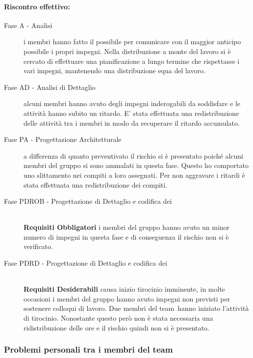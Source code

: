 \documentclass[../PianoProgetto.tex]{subfiles}
\begin{document}
	\paragraph*{Riscontro effettivo:}
		\begin{description}
			\item[Fase A - Analisi] i membri hanno fatto il possibile per comunicare con il maggior anticipo possibile i propri impegni. Nella distribuzione a monte del lavoro si è cercato di effettuare una pianificazione a lungo termine che rispettasse i vari impegni, mantenendo una distribuzione equa del lavoro.
			\item[Fase AD - Analisi di Dettaglio] alcuni membri hanno avuto degli impegni inderogabili da soddisfare e le attività hanno subito un ritardo. E' stata effettuata una redistribuzione delle attività tra i membri in modo da recuperare il ritardo accumulato. 
			\item[Fase PA - Progettazione Architetturale] a differenza  di quanto preventivato il rischio si è presentato poiché alcuni membri del gruppo si sono ammalati in questa fase. Questo ho comportato uno slittamento nei compiti a loro assegnati. Per non aggravare i ritardi è stata effettuata una redistribuzione dei compiti.
			\item[Fase PDROB - Progettazione di Dettaglio e codifica dei]  \ \\
					\textbf{Requisiti Obbligatori} i membri del gruppo hanno avuto un minor numero di impegni in questa fase e di conseguenza il rischio non si è verificato.
			\item[Fase PDRD - Progettazione di Dettaglio e codifica dei] \ \\
					\textbf{Requisiti Desiderabili} causa inizio tirocinio imminente, in molte occasioni i membri del gruppo hanno avuto impegni non previsti per sostenere colloqui di lavoro. Due membri del team\g\ hanno iniziato l'attività di tirocinio. Nonostante questo però non è stata necessaria una ridistribuzione delle ore e il rischio quindi non si è presentato.
		\end{description}
	
\newpage
\subsubsection{Problemi personali tra i membri del team}
\label{sec:Problemi personali tra i membri del team}
\end{document}
